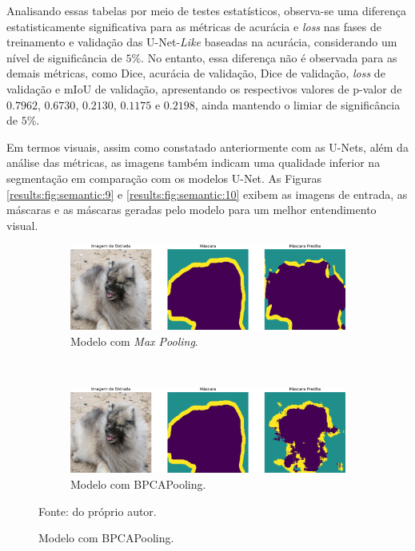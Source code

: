 Analisando essas tabelas por meio de testes estatísticos, observa-se uma diferença estatisticamente significativa para as métricas de acurácia e \textit{loss} nas fases de treinamento e validação das U-Net-\textit{Like} baseadas na acurácia, considerando um nível de significância de $5\%$. No entanto, essa diferença não é observada para as demais métricas, como Dice, acurácia de validação, Dice de validação, \textit{loss} de validação e mIoU de validação, apresentando os respectivos valores de p-valor de $0.7962$, $0.6730$, $0.2130$, $0.1175$ e $0.2198$, ainda mantendo o limiar de significância de $5\%$.

Em termos visuais, assim como constatado anteriormente com as U-Nets, além da análise das métricas, as imagens também indicam uma qualidade inferior na segmentação em comparação com os modelos U-Net. As Figuras \ref{results:fig:semantic:9} e \ref{results:fig:semantic:10} exibem as imagens de entrada, as máscaras e as máscaras geradas pelo modelo para um melhor entendimento visual.

\begin{figure}[H]
    \centering
   \caption{Imagem de entrada, máscara e saída do modelo U-Net-\textit{Like} baseado em acurácia, respectivamente.}
    \label{results:fig:semantic:9}
    \begin{subfigure}[t]{0.9\textwidth}
        \centering
        \includegraphics[width=1\linewidth]{recursos/imagens/results/image_0_max_unetlike_500.png}
        \caption{Modelo com \textit{Max Pooling}.}
        \label{results:fig:semantic:9.1}
    \end{subfigure}%
    ~
    
    \begin{subfigure}[t]{0.9\textwidth}
        \centering
        \includegraphics[width=1\linewidth]{recursos/imagens/results/image_0_bpca_unetlike_500.png}
        \caption{Modelo com BPCAPooling.}
        \label{results:fig:semantic:9.2}
    \end{subfigure}%

    Fonte: do próprio autor.
\end{figure}

